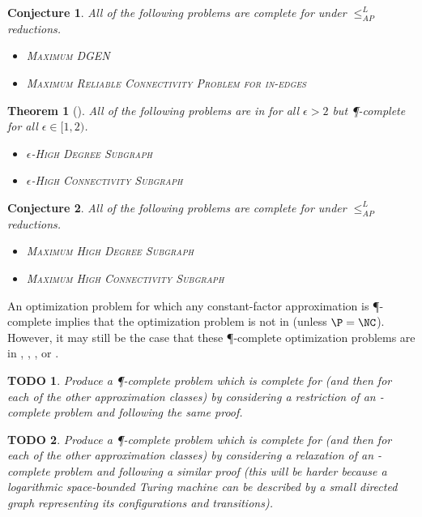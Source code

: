 \documentclass[]{article}
\theoremstyle{plain}
\newtheorem{conjecture}{Conjecture}
\newtheorem{theorem}{Theorem}
\newtheorem{todo}{TODO}
\theoremstyle{definition}
\newcommand{\APr}{\leq_{AP}^{L}}
\begin{document}
\begin{conjecture}
  All of the following problems are complete for \logApxNCOp{} under $\APr$ reductions.
  \begin{itemize}
  \item \textsc{Maximum DGEN}
  \item \textsc{Maximum Reliable Connectivity Problem for in-edges}
  \end{itemize}
\end{conjecture}

\begin{theorem}[{\cite[{Theorem~4 and Theorem~5}]{am84}}]
  All of the following problems are in \NC{} for all $\epsilon > 2$ but \P-complete for all $\epsilon \in [1, 2)$.
  \begin{itemize}
  \item \textsc{$\epsilon$-High Degree Subgraph} \cite[Theorem~4 and Theorem~5]{am84}
  \item \textsc{$\epsilon$-High Connectivity Subgraph} \cite[Theorem~6]{ss89}
  \end{itemize}
\end{theorem}

\begin{conjecture}
  All of the following problems are complete for \ApxNCOp{} under $\APr$ reductions.
  \begin{itemize}
  \item \textsc{Maximum High Degree Subgraph}
  \item \textsc{Maximum High Connectivity Subgraph}
  \end{itemize}
\end{conjecture}

An optimization problem for which any constant-factor approximation is \P-complete implies that the optimization problem is not in \ApxNCO{} (unless $\P=\NC$).
However, it may still be the case that these \P-complete optimization problems are in \logApxNCO, \polyApxNCO, \expApxNCO, or \NNCO.

\begin{todo}
  Produce a \P-complete problem which is complete for \ApxNCO{} (and then for each of the other approximation classes) by considering a restriction of an \NP-complete problem and following the same proof.
\end{todo}

\begin{todo}
  Produce a \P-complete problem which is complete for \ApxNCO{} (and then for each of the other approximation classes) by considering a relaxation of an \NL-complete problem and following a similar proof (this will be harder because a logarithmic space-bounded Turing machine can be described by a small directed graph representing its configurations and transitions).
\end{todo}
\end{document}
